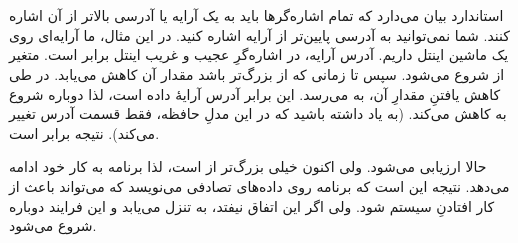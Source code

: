 \section{}
\paragraph{}\label{answer:21}
استاندارد  بیان می‌دارد که تمام اشاره‌گرها باید به یک آرایه یا آدرسی بالاتر از آن اشاره کنند. شما نمی‌توانید به آدرسی پایین‌تر از آرایه اشاره کنید. در این مثال، ما آرایه‌ای روی یک ماشین اینتل داریم. آدرس آرایه، در اشاره‌گرِ عجیب و غریب اینتل برابر  است. متغیر  از  شروع می‌شود. سپس تا زمانی که از  بزرگ‌تر باشد مقدار آن کاهش می‌یابد. در طی کاهش یافتنِ مقدارِ آن،  به  می‌رسد. این برابر آدرس آرایهٔ داده است، لذا دوباره شروع به کاهش می‌کند. (به یاد داشته باشید که در این مدلِ حافظه، فقط قسمت آدرس تغییر می‌کند). نتیجه برابر  است.

حالا  ارزیابی می‌شود. ولی  اکنون خیلی بزرگ‌تر از  است، لذا برنامه به کار خود ادامه می‌دهد. نتیجه این است که برنامه روی داده‌های تصادفی می‌نویسد که می‌تواند باعث از کار افتادنِ سیستم شود. ولی اگر این اتفاق نیفتد،  به  تنزل می‌یابد و این فرایند دوباره شروع می‌شود.
